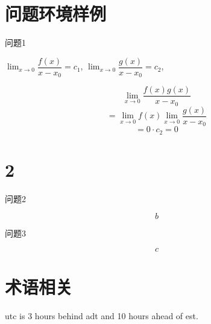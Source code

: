\documentclass[ebook,fleqn]{problemset}
\begin{document}
\listoftodos %
\tableofcontents %
\chapter{问题环境样例}
  \begin{problem}
    问题1
  \end{problem}

  \begin{solution}
    $\lim_{x \to 0} \dfrac{f(x)}{x-x_0} = c_1$,
    $\lim_{x \to 0} \dfrac{g(x)}{x-x_0} = c_2$,

    \[
      \lim_{x\to0} \dfrac{f(x)g(x)}{x-x_0}
    \]
    \[
     = \lim_{x\to0} f(x) \lim_{x \to 0} \dfrac{g(x)}{x-x_0}
    \]
    \[
      = 0 \cdot c_2 = 0
    \]
  \end{solution}
  \chapter{2}

  \begin{problem}
    问题2
  \end{problem}
  \begin{solution}
      \[b\]
  \end{solution}
  \begin{problem}
    问题3
  \end{problem}
  \begin{solution}
      \[c\]
  \end{solution}

\chapter{术语相关}


\gls{utc} is 3 hours behind \gls{adt} and 10 hours ahead of \gls{est}.

\printacronyms


\end{document}
